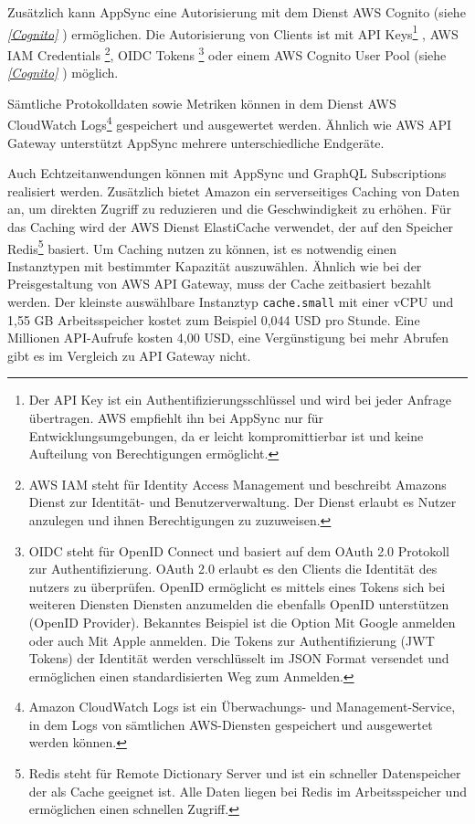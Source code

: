 Zusätzlich kann AppSync eine Autorisierung mit dem Dienst AWS Cognito (siehe \textit{\ref{Cognito} }) ermöglichen.
Die Autorisierung von Clients ist mit API Keys\footnote{Der API Key ist ein Authentifizierungsschlüssel und wird bei jeder Anfrage übertragen. AWS empfiehlt ihn bei AppSync nur für Entwicklungsumgebungen,
da er leicht kompromittierbar ist und keine Aufteilung von Berechtigungen ermöglicht.}
, AWS IAM Credentials \footnote{
    AWS IAM steht für Identity Access Management und beschreibt Amazons Dienst zur Identität- und Benutzerverwaltung. Der Dienst erlaubt es Nutzer anzulegen und
    ihnen Berechtigungen zu zuzuweisen.},
    OIDC Tokens \footnote{OIDC steht für OpenID Connect und basiert auf dem OAuth 2.0 Protokoll zur Authentifizierung.
    OAuth 2.0 erlaubt es den Clients die Identität des nutzers zu überprüfen.
    OpenID ermöglicht es mittels eines Tokens sich bei weiteren Diensten Diensten anzumelden die ebenfalls OpenID unterstützen (OpenID Provider).
    Bekanntes Beispiel ist die Option \glqq Mit Google anmelden\grqq{} oder auch \glqq Mit Apple anmelden\grqq.
    Die Tokens zur Authentifizierung (JWT Tokens) der Identität werden verschlüsselt im JSON Format versendet und ermöglichen einen standardisierten Weg zum Anmelden.

          } oder einem AWS
Cognito User Pool (siehe \textit{\ref{Cognito} }) möglich. \cite[]{AppSyncAuth}

Sämtliche Protokolldaten sowie Metriken können in dem Dienst AWS CloudWatch Logs\footnote{ Amazon CloudWatch Logs ist ein Überwachungs- und Management-Service, in dem Logs von sämtlichen AWS-Diensten gespeichert und ausgewertet werden können. } gespeichert und ausgewertet werden.
Ähnlich wie AWS API Gateway unterstützt AppSync mehrere unterschiedliche Endgeräte.

Auch Echtzeitanwendungen können mit AppSync und GraphQL Subscriptions realisiert werden.
Zusätzlich bietet Amazon ein serverseitiges Caching von Daten an, um direkten Zugriff zu reduzieren und die Geschwindigkeit zu erhöhen.
Für das Caching wird der AWS Dienst ElastiCache verwendet, der auf den Speicher Redis\footnote{Redis steht für Remote Dictionary Server und ist ein schneller Datenspeicher der als Cache geeignet ist. Alle Daten liegen bei Redis im Arbeitsspeicher und ermöglichen einen schnellen Zugriff.} basiert.
Um Caching nutzen zu können, ist es notwendig einen Instanztypen mit bestimmter Kapazität auszuwählen.
Ähnlich wie bei der Preisgestaltung von AWS API Gateway, muss der Cache zeitbasiert bezahlt werden.
Der kleinste auswählbare Instanztyp \verb+cache.small+ mit einer vCPU und 1,55 GB Arbeitsspeicher kostet zum Beispiel 0,044 USD pro Stunde.
Eine Millionen API-Aufrufe kosten 4,00 USD, eine Vergünstigung bei mehr Abrufen gibt es im Vergleich zu API Gateway nicht.
\cite[]{AppSync} \cite[]{AppSyncPreise}




